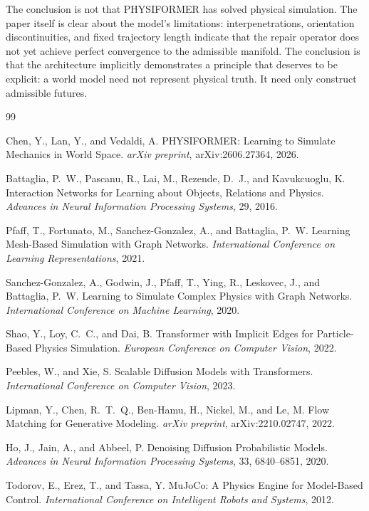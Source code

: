 \documentclass[12pt,oneside]{article}
\theoremstyle{definition}
\begin{document}
The conclusion is not that PHYSIFORMER has solved physical simulation. The paper
itself is clear about the model's limitations: interpenetrations, orientation
discontinuities, and fixed trajectory length indicate that the repair operator
does not yet achieve perfect convergence to the admissible manifold. The conclusion
is that the architecture implicitly demonstrates a principle that deserves to be
explicit: a world model need not represent physical truth. It need only construct
admissible futures.

\begin{thebibliography}{99}

Chen, Y., Lan, Y., and Vedaldi, A.
{PHYSIFORMER}: Learning to Simulate Mechanics in World Space.
\textit{arXiv preprint},
arXiv:2606.27364, 2026.

Battaglia, P.~W., Pascanu, R., Lai, M., Rezende, D.~J., and Kavukcuoglu, K.
Interaction Networks for Learning about Objects, Relations and Physics.
\textit{Advances in Neural Information Processing Systems},
29, 2016.

Pfaff, T., Fortunato, M., Sanchez-Gonzalez, A., and Battaglia, P.~W.
Learning Mesh-Based Simulation with Graph Networks.
\textit{International Conference on Learning Representations},
2021.

Sanchez-Gonzalez, A., Godwin, J., Pfaff, T., Ying, R., Leskovec, J., and Battaglia, P.~W.
Learning to Simulate Complex Physics with Graph Networks.
\textit{International Conference on Machine Learning},
2020.

Shao, Y., Loy, C.~C., and Dai, B.
Transformer with Implicit Edges for Particle-Based Physics Simulation.
\textit{European Conference on Computer Vision},
2022.

Peebles, W., and Xie, S.
Scalable Diffusion Models with Transformers.
\textit{International Conference on Computer Vision},
2023.

Lipman, Y., Chen, R.~T.~Q., Ben-Hamu, H., Nickel, M., and Le, M.
Flow Matching for Generative Modeling.
\textit{arXiv preprint},
arXiv:2210.02747, 2022.

Ho, J., Jain, A., and Abbeel, P.
Denoising Diffusion Probabilistic Models.
\textit{Advances in Neural Information Processing Systems},
33, 6840--6851, 2020.

Todorov, E., Erez, T., and Tassa, Y.
{MuJoCo}: A Physics Engine for Model-Based Control.
\textit{International Conference on Intelligent Robots and Systems},
2012.


\end{thebibliography}
\end{document}

